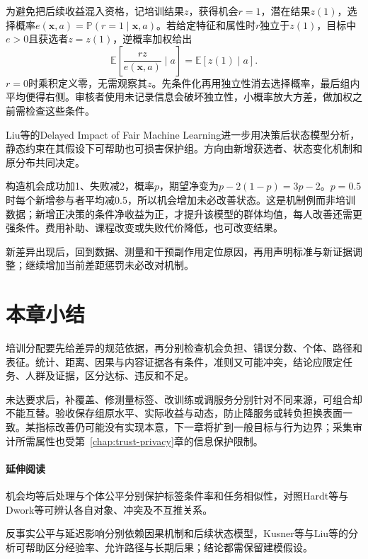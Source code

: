 为避免把后续收益混入资格，记培训结果$z$，获得机会$r=1$，潜在结果$z(1)$，选择概率$e(\bm{x},a)=\mathbb P(r=1\mid\bm{x},a)$。若给定特征和属性时$r$独立于$z(1)$，目标中$e>0$且获选者$z=z(1)$，逆概率加权给出
\begin{equation}
 \mathbb E\!\left[\frac{r z}{e(\bm{x},a)}\mid a\right]
 =\mathbb E[z(1)\mid a].
 \label{eq:fairness-selective-weight}
\end{equation}
$r=0$时乘积定义零，无需观察其$z$。先条件化再用独立性消去选择概率，最后组内平均便得右侧。审核者使用未记录信息会破坏独立性，小概率放大方差，做加权之前需检查这些条件。

Liu等的Delayed Impact of Fair Machine Learning进一步用决策后状态模型分析，静态约束在其假设下可帮助也可损害保护组。方向由新增获选者、状态变化机制和原分布共同决定。

构造机会成功加1、失败减2，概率$p$，期望净变为$p-2(1-p)=3p-2$。$p=0.5$时每个新增参与者平均减0.5，所以机会增加未必改善状态。这是机制例而非培训数据；新增正决策的条件净收益为正，才提升该模型的群体均值，每人改善还需更强条件。费用补助、课程改变或失败代价降低，也可改变结果。

新差异出现后，回到数据、测量和干预副作用定位原因，再用声明标准与新证据调整；继续增加当前差距惩罚未必改对机制。

\section{本章小结}
\label{sec:fairness-summary}

培训分配要先给差异的规范依据，再分别检查机会负担、错误分数、个体、路径和表征。统计、距离、因果与内容证据各有条件，准则又可能冲突，结论应限定任务、人群及证据，区分达标、违反和不足。

未达要求后，补覆盖、修测量标签、改训练或调服务分别针对不同来源，可组合却不能互替。验收保存组原水平、实际收益与动态，防止降服务或转负担换表面一致。某指标改善仍可能没有实现本意，下一章将扩到一般目标与行为边界；采集审计所需属性也受第~\ref{chap:trust-privacy}章的信息保护限制。

\paragraph{延伸阅读}

机会均等后处理与个体公平分别保护标签条件率和任务相似性，对照Hardt等与Dwork等可辨认各自对象、冲突及不互推关系。

反事实公平与延迟影响分别依赖因果机制和后续状态模型，Kusner等与Liu等的分析可帮助区分经验率、允许路径与长期后果；结论都需保留建模假设。
